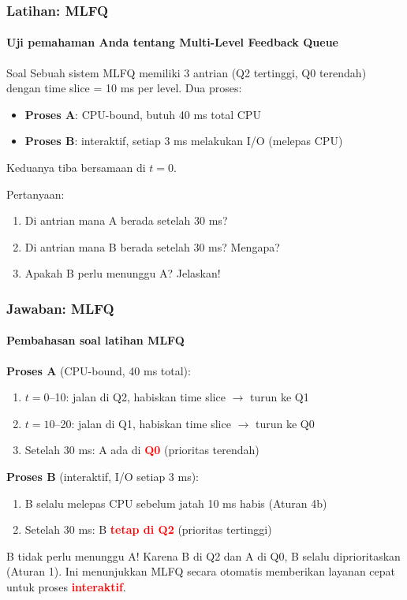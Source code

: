 \documentclass[t,aspectratio=169,xcolor=dvipsnames]{beamer}
\newcommand{\tem}[1]{\textbf{\textcolor{red}{#1}}}
\begin{document}
\begin{frame}
    \frametitle{Latihan: MLFQ}
    \framesubtitle{Uji pemahaman Anda tentang Multi-Level Feedback Queue}
    \small
    \begin{block}{Soal}
        Sebuah sistem MLFQ memiliki 3 antrian (Q2 tertinggi, Q0 terendah) dengan time slice = 10 ms per level. Dua proses:
        \begin{itemize}
            \item \textbf{Proses A}: CPU-bound, butuh 40 ms total CPU
            \item \textbf{Proses B}: interaktif, setiap 3 ms melakukan I/O (melepas CPU)
        \end{itemize}
        Keduanya tiba bersamaan di $t=0$.

        \vspace{0.1cm}
        Pertanyaan:
        \begin{enumerate}
            \item Di antrian mana A berada setelah 30 ms?
            \item Di antrian mana B berada setelah 30 ms? Mengapa?
            \item Apakah B perlu menunggu A? Jelaskan!
        \end{enumerate}
    \end{block}
\end{frame}

\begin{frame}
    \frametitle{Jawaban: MLFQ}
    \framesubtitle{Pembahasan soal latihan MLFQ}
    \small
    \textbf{Proses A} (CPU-bound, 40 ms total):
    \begin{enumerate}\itemsep0.05em
        \item $t=0$--10: jalan di Q2, habiskan time slice $\rightarrow$ turun ke Q1
        \item $t=10$--20: jalan di Q1, habiskan time slice $\rightarrow$ turun ke Q0
        \item Setelah 30 ms: A ada di \tem{Q0} (prioritas terendah)
    \end{enumerate}

    \vspace{0.1cm}
    \textbf{Proses B} (interaktif, I/O setiap 3 ms):
    \begin{enumerate}\itemsep0.05em
        \item B selalu melepas CPU sebelum jatah 10 ms habis (Aturan 4b)
        \item Setelah 30 ms: B \tem{tetap di Q2} (prioritas tertinggi)
    \end{enumerate}

    \vspace{0.1cm}
    \begin{exampleblock}{B tidak perlu menunggu A!}
        Karena B di Q2 dan A di Q0, B selalu diprioritaskan (Aturan 1). Ini menunjukkan MLFQ secara otomatis memberikan layanan cepat untuk proses \tem{interaktif}.
    \end{exampleblock}
\end{frame}
\end{document}
